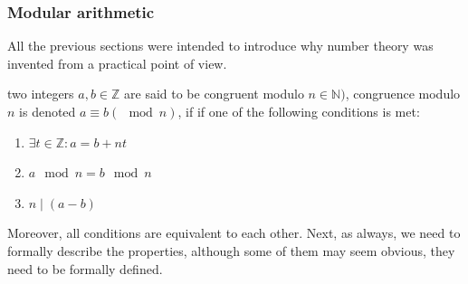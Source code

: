 \documentclass[../lecture-notes.tex]{subfiles}
\begin{document}
\subsubsection{Modular arithmetic}

All the previous sections were intended to introduce why number theory was invented from a practical point of view.

\begin{definition}
    two integers $a, b \in \mathbb{Z}$ are said to be congruent modulo $n \in \mathbb{N})$, congruence modulo $n$ is denoted $a \equiv b(\mod n)$, if if one of the following conditions is met:
    \begin{enumerate}
        \item $\exists t \in \mathbb{Z}: a = b + nt$
        \item $a \mod n = b \mod n$
        \item $ n \mid (a - b)$
    \end{enumerate}
\end{definition}

Moreover, all conditions are equivalent to each other. Next, as always, we need to formally describe the properties, although some of them may seem obvious, they need to be formally defined.
\end{document}
